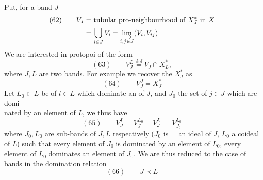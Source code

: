 

Put, for a band $J$
\[
\begin{aligned}
(62)\qquad V_J&=\text{tubular pro-neighbourhood of }X_J^*\text{ in }X\\
&=\bigcup_{i\in J}V_i=\varinjlim_{i,j\in J}(V_i,V_{ij})
\end{aligned}
\]
We are interested in protopoi of the form
\[
(63)\qquad V_J^L\overset{\mathrm{def}}{=}V_J\cap X_L^*,
\]
where $J,L$ are two bands. For example we recover the $X_J^*$ as
\[
(64)\qquad V_J^J=X_J^*
\]
Let $L_0\subset L$ be  of $l\in L$ which dominate an  of $J$, and $J_0$ the set of $j\in J$ which are domi-\\nated by an element of $L$, we thus have
\[
(65)\qquad V_J^L=V_J^{L_0}=V_{J_0}^L=V_{J_0}^{L_0}
\]
where $J_0,L_0$ are sub-bands of $J,L$ respectively ($J_0$ is = an ideal of $J$, $L_0$ a coideal of $L$) such that every element of $J_0$ is dominated by an element of $L_0$, every element of $L_0$ dominates an element of $J_0$. We are thus reduced to the case of bands in the domination relation
\[
(66)\qquad J\prec L
\]
